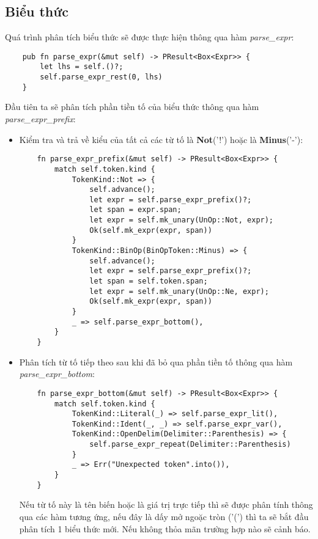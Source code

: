 \subsection{Biểu thức}
Quá trình phân tích biểu thức sẽ được thực hiện thông qua hàm \textit{parse\_expr}:
\begin{lstlisting}
    pub fn parse_expr(&mut self) -> PResult<Box<Expr>> {
        let lhs = self.()?;
        self.parse_expr_rest(0, lhs)
    }
\end{lstlisting}
Đầu tiên ta sẽ phân tích phần tiền tố của biểu thức thông qua hàm \\\textit{parse\_expr\_prefix}:
\begin{itemize}
    \item Kiểm tra và trả về kiểu của tất cả các từ tố là \textbf{Not}('!') hoặc là \textbf{Minus}('-'):
\begin{lstlisting}
    fn parse_expr_prefix(&mut self) -> PResult<Box<Expr>> {
        match self.token.kind {
            TokenKind::Not => {
                self.advance();
                let expr = self.parse_expr_prefix()?;
                let span = expr.span;
                let expr = self.mk_unary(UnOp::Not, expr);
                Ok(self.mk_expr(expr, span))
            }
            TokenKind::BinOp(BinOpToken::Minus) => {
                self.advance();
                let expr = self.parse_expr_prefix()?;
                let span = self.token.span;
                let expr = self.mk_unary(UnOp::Ne, expr);
                Ok(self.mk_expr(expr, span))
            }
            _ => self.parse_expr_bottom(),
        }
    }
\end{lstlisting}
    \item Phân tích từ tố tiếp theo sau khi đã bỏ qua phần tiền tố thông qua hàm \textit{parse\_expr\_bottom}:
\begin{lstlisting}
    fn parse_expr_bottom(&mut self) -> PResult<Box<Expr>> {
        match self.token.kind {
            TokenKind::Literal(_) => self.parse_expr_lit(),
            TokenKind::Ident(_, _) => self.parse_expr_var(),
            TokenKind::OpenDelim(Delimiter::Parenthesis) => {
                self.parse_expr_repeat(Delimiter::Parenthesis)
            }
            _ => Err("Unexpected token".into()),
        }
    }
\end{lstlisting}
    Nếu từ tố này là tên biến hoặc là giá trị trực tiếp thì sẽ được phân tính thông qua các hàm tương ứng, nếu đây là dấy mở ngoặc tròn ('(') thì ta sẽ bắt đầu phân tích 1 biểu thức mới. Nếu không thỏa mãn trường hợp nào sẽ cảnh báo.
\end{itemize}
